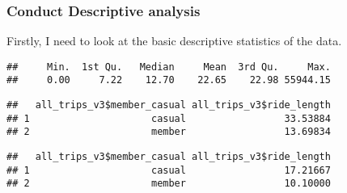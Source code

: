 \documentclass[
]{article}
\newenvironment{Shaded}{\begin{snugshade}}{\end{snugshade}}
\newcommand{\AttributeTok}[1]{\textcolor[rgb]{0.77,0.63,0.00}{#1}}
\newcommand{\CommentTok}[1]{\textcolor[rgb]{0.56,0.35,0.01}{\textit{#1}}}
\newcommand{\FunctionTok}[1]{\textcolor[rgb]{0.00,0.00,0.00}{#1}}
\newcommand{\NormalTok}[1]{#1}
\newcommand{\SpecialCharTok}[1]{\textcolor[rgb]{0.00,0.00,0.00}{#1}}
\begin{document}
\hypertarget{conduct-descriptive-analysis}{%
\subsubsection{Conduct Descriptive
analysis}\label{conduct-descriptive-analysis}}

Firstly, I need to look at the basic descriptive statistics of the data.

\begin{Shaded}
\end{Shaded}

\begin{verbatim}
##     Min.  1st Qu.   Median     Mean  3rd Qu.     Max. 
##     0.00     7.22    12.70    22.65    22.98 55944.15
\end{verbatim}

\begin{Shaded}
\end{Shaded}

\begin{verbatim}
##   all_trips_v3$member_casual all_trips_v3$ride_length
## 1                     casual                 33.53884
## 2                     member                 13.69834
\end{verbatim}

\begin{Shaded}
\end{Shaded}

\begin{verbatim}
##   all_trips_v3$member_casual all_trips_v3$ride_length
## 1                     casual                 17.21667
## 2                     member                 10.10000
\end{verbatim}
\end{document}
